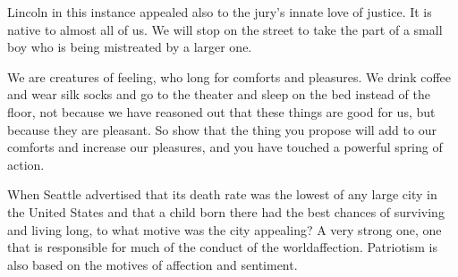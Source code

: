 \documentclass[10pt]{article}
\begin{document}
Lincoln in this instance appealed also to the jury's innate love of justice. It is native to almost all of us. We will stop on the street to take the part of a small boy who is being mistreated by a larger one.

We are creatures of feeling, who long for comforts and pleasures. We drink coffee and wear silk socks and go to the theater and sleep on the bed instead of the floor, not because we have reasoned out that these things are good for us, but because they are pleasant. So show that the thing you propose will add to our comforts and increase our pleasures, and you have touched a powerful spring of action.

When Seattle advertised that its death rate was the lowest of any large city in the United States and that a child born there had the best chances of surviving and living long, to what motive was the city appealing? A very strong one, one that is responsible for much of the conduct of the worldaffection. Patriotism is also based on the motives of affection and sentiment.
\end{document}
